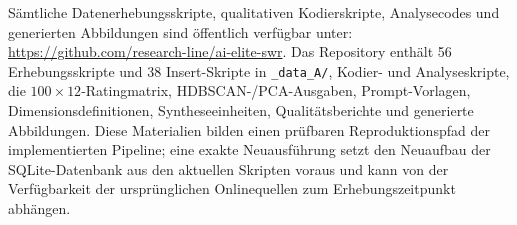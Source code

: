\documentclass[12pt,a4paper]{article}
\begin{document}

\smallskip
{}

\noindent Sämtliche Datenerhebungsskripte, qualitativen Kodierskripte, Analysecodes und generierten Abbildungen sind öffentlich verfügbar unter: \url{https://github.com/research-line/ai-elite-swr}. Das Repository enthält 56 Erhebungsskripte und 38 Insert-Skripte in \texttt{\_data\_A/}, Kodier- und Analyseskripte, die $100 \times 12$-Ratingmatrix, HDBSCAN-/PCA-Ausgaben, Prompt-Vorlagen, Dimensionsdefinitionen, Syntheseeinheiten, Qualitätsberichte und generierte Abbildungen. Diese Materialien bilden einen prüfbaren Reproduktionspfad der implementierten Pipeline; eine exakte Neuausführung setzt den Neuaufbau der SQLite-Datenbank aus den aktuellen Skripten voraus und kann von der Verfügbarkeit der ursprünglichen Onlinequellen zum Erhebungszeitpunkt abhängen.
\endgroup

\newpage
\end{document}
